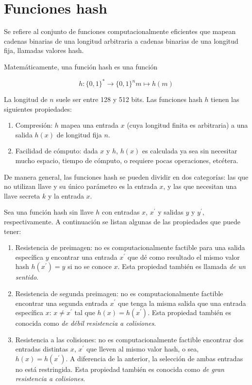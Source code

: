 %
%

\section{Funciones hash}

Se refiere al conjunto de funciones computacionalmente eficientes que
mapean cadenas binarias de una longitud arbitraria a cadenas binarias
de una longitud fija, llamadas valores hash.

Matemáticamente, una función hash es una función

\begin{equation}
  \label{funcion_hash_def}
  h: \{0, 1\}^* \longrightarrow \{0,1\}^n
  m \longmapsto h(m)
\end{equation}

La longitud de $n$ suele ser entre 128 y 512 bits. Las funciones hash
$h$ tienen las siguientes propiedades:
\begin{enumerate}
  \item Compresión: $h$ mapea una entrada $x$ (cuya longitud
    finita es arbitraria) a una salida $h(x)$ de longitud fija $n$.
  \item Facilidad de cómputo: dada $x$ y $h$, $h(x)$ es
    calculada ya sea sin necesitar mucho espacio, tiempo de cómputo, o
    requiere pocas operaciones, etcétera.
\end{enumerate}

De manera general, las funciones hash se pueden dividir en dos
categorías: las que no utilizan llave y su único parámetro es la entrada
$x$, y las que necesitan una llave secreta $k$ y la entrada $x$.

Sea una función hash sin llave $h$ con entradas $x$, $x^\prime$ y
salidas $y$ y $y^\prime$, respectivamente. A continuación se listan
algunas de las propiedades que puede tener:
\begin{enumerate}
  \item Resistencia de preimagen: no es computacionalmente factible
    para una salida específica $y$ encontrar una entrada $x^\prime$ que
    dé como resultado el mismo valor hash $h(x^\prime) = y$ si no se
    conoce $x$. Esta propiedad también es llamada
    \textit{de un sentido}.
  \item Resistencia de segunda preimagen: no es computacionalmente
    factible encontrar una segunda entrada $x^\prime$  que tenga la
    misma salida que una entrada específica $x$: $x \neq x^\prime$
    tal que $h(x) = h(x^\prime)$. Esta propiedad también es conocida
    como \textit{de débil resistencia a colisiones}.
  \item Resistencia a las colisiones: no es computacionalmente factible
    encontrar dos entradas distintas $x$, $x^\prime$ que lleven al
    mismo valor hash, o sea, $h(x) = h(x^\prime)$. A diferencia de la
    anterior, la selección de ambas entradas no está restringida. Esta
    propiedad también es conocida como
    \textit{de gran resistencia a colisiones}.
\end{enumerate}

